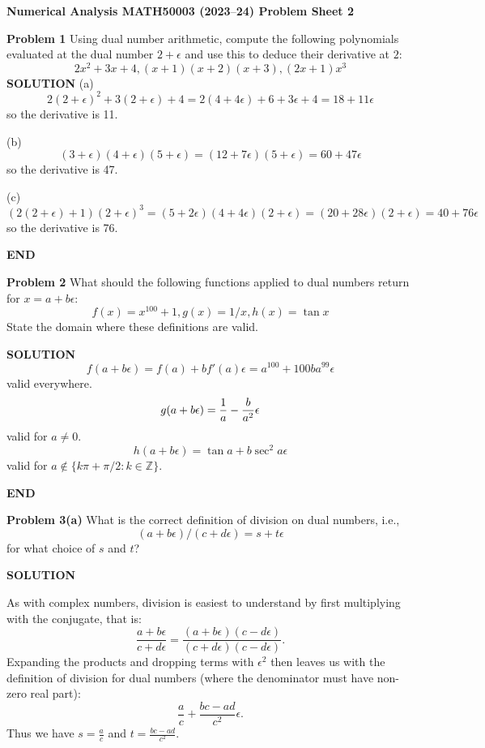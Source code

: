 \documentclass[12pt,a4paper]{article}
\def\endash{–}
\def\bbZ{ {\mathbb Z} }
\begin{document}
\textbf{Numerical Analysis MATH50003 (2023\ensuremath{\endash}24) Problem Sheet 2}

\textbf{Problem 1} Using dual number arithmetic, compute the following polynomials evaluated at the dual number $2+\ensuremath{\epsilon}$ and use this to deduce their derivative at $2$:
\[
2x^2 + 3x + 4, (x+1)(x+2)(x+3), (2x+1)x^3
\]
\textbf{SOLUTION} (a)
\[
2(2+\ensuremath{\epsilon})^2 + 3(2+\ensuremath{\epsilon}) + 4 = 2(4+4\ensuremath{\epsilon}) + 6+3\ensuremath{\epsilon} + 4 = 18 + 11\ensuremath{\epsilon}
\]
so the derivative is 11.

(b) 
\[
(3+\ensuremath{\epsilon})(4+\ensuremath{\epsilon})(5+\ensuremath{\epsilon}) = (12+7\ensuremath{\epsilon})(5+\ensuremath{\epsilon}) = 60+47\ensuremath{\epsilon}
\]
so the derivative is 47.

(c)
\[
(2(2+\ensuremath{\epsilon})+1)(2+\ensuremath{\epsilon})^3 = 
(5+2\ensuremath{\epsilon})(4+4\ensuremath{\epsilon})(2+\ensuremath{\epsilon}) = 
(20 + 28\ensuremath{\epsilon})(2+\ensuremath{\epsilon}) = 40 + 76\ensuremath{\epsilon}
\]
so the derivative is 76.

\textbf{END}

\textbf{Problem 2} What should the following functions applied to dual numbers return for $x = a+b \ensuremath{\epsilon}$:
\[
f(x) = x^{100}    + 1, g(x) = 1/x, h(x) = \tan x
\]
State  the domain where these definitions are valid.

\textbf{SOLUTION}
\[
f(a+ b\ensuremath{\epsilon}) = f(a) + b f'(a) \ensuremath{\epsilon} = a^{100} + 100ba^{99} \ensuremath{\epsilon}
\]
valid everywhere.
\[
g(a+ b\ensuremath{\epsilon}) =  {1 \over a} - {b \over a^2} \ensuremath{\epsilon}
\]
valid for $a \ensuremath{\neq} 0$.
\[
h(a+b\ensuremath{\epsilon}) = \tan a + b \sec^2 a \ensuremath{\epsilon}
\]
valid for $a \ensuremath{\notin} \{ k\ensuremath{\pi}+\ensuremath{\pi}/2 : k \ensuremath{\in} \ensuremath{\bbZ}\}$.

\textbf{END}

\textbf{Problem 3(a)} What is the correct definition of division on dual numbers, i.e.,
\[
(a + b \ensuremath{\epsilon} )/(c + d \ensuremath{\epsilon} ) = s + t \ensuremath{\epsilon}
\]
for what choice of $s$ and $t$? 

\textbf{SOLUTION}

As with complex numbers, division is easiest to understand by first multiplying with the conjugate, that is:
\[
\frac{a+b\ensuremath{\epsilon}}{c+d\ensuremath{\epsilon}} = \frac{(a+b\ensuremath{\epsilon})(c-d\ensuremath{\epsilon})}{(c+d\ensuremath{\epsilon})(c-d\ensuremath{\epsilon})}.
\]
Expanding the products and dropping terms with $\ensuremath{\epsilon}^2$ then leaves us with the definition of division for dual numbers (where the denominator must have non-zero real part):
\[
\frac{a}{c} + \frac{bc - ad}{c^2}\ensuremath{\epsilon}.
\]
Thus we have $s = \frac{a}{c}$ and $t = \frac{bc - ad}{c^2}$.
\end{document}
